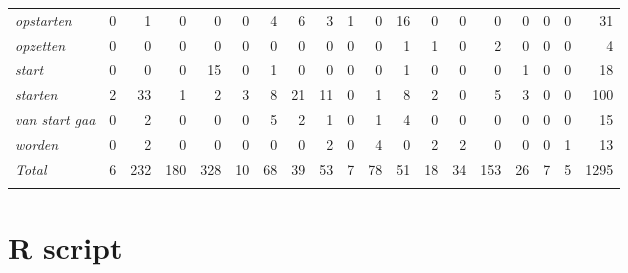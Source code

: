 \begin{table}
{\begin{tabular}{>{\itshape}lrrrrrrrrrrrrrrrrrr}
opstarten &  0 &  1 &  0 &  0 &  0 &  4 &  6 &  3 &  1 &  0 &  16 &  0 &  0 &  0 &  0 &  0 &  0 &  31\\
opzetten &  0 &  0 &  0 &  0 &  0 &  0 &  0 &  0 &  0 &  0 &  1 &  1 &  0 &  2 &  0 &  0 &  0 &  4\\
start &  0 &  0 &  0 &  15 &  0 &  1 &  0 &  0 &  0 &  0 &  1 &  0 &  0 &  0 &  1 &  0 &  0 &  18\\
starten &  2 &  33 &  1 &  2 &  3 &  8 &  21 &  11 &  0 &  1 &  8 &  2 &  0 &  5 &  3 &  0 &  0 &  100\\
van start gaa &  0 &  2 &  0 &  0 &  0 &  5 &  2 &  1 &  0 &  1 &  4 &  0 &  0 &  0 &  0 &  0 &  0 &  15\\
worden &  0 &  2 &  0 &  0 &  0 &  0 &  0 &  2 &  0 &  4 &  0 &  2 &  2 &  0 &  0 &  0 &  1 &  13\\
\midrule
\normalfont Total & 6 &  232 &  180 &  328 &  10 &  68 &  39 &  53 &  7 &  78 &  51 &  18 &  34 &  153 &  26 &  7 &  5 &  1295\\
\lspbottomrule
\end{tabular}}
\end{table} 

\chapter{R script}\label{ch:B}


